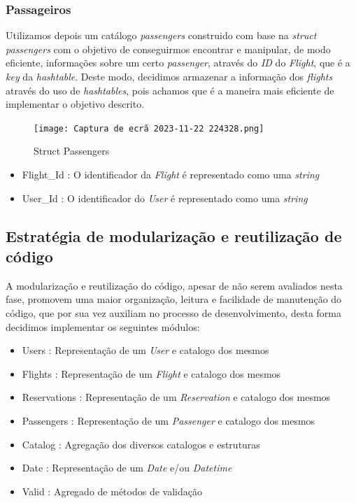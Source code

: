 \documentclass[11pt]{article}
\begin{document}
\subsubsection{Passageiros}
    Utilizamos depois um catálogo \textit{passengers} construido
    com base na \textit{struct passengers} com o objetivo de conseguirmos encontrar e manipular, de modo eficiente, informações sobre um certo \textit{passenger}, através do \textit{ID} do \textit{Flight}, que é a \textit{key} da \textit{hashtable}. Deste modo, decidimos armazenar a informação dos \textit{flights} através do uso de \textit{hashtables}, pois achamos que é a maneira mais eficiente de implementar o objetivo descrito.
    
    \begin{figure}[hbt!]
        \centering
        \texttt{[image: Captura de ecrã 2023-11-22 224328.png]}
        \caption{Struct Passengers}
        \label{fig:example}
    \end{figure}
    
    \begin{itemize}
        \item Flight_Id : O identificador da \textit{Flight} é representado como uma \textit{string}
        \item User_Id : O identificador do \textit{User} é representado como uma \textit{string}
    \end{itemize}
\newpage


\subsection{Estratégia de modularização e reutilização de código}
A modularização e reutilização do código, apesar de não serem avaliados nesta fase, promovem uma maior organização, leitura e facilidade de manutenção do código, que por sua vez auxiliam no processo de desenvolvimento, desta forma decidimos implementar os seguintes módulos:
    \begin{itemize}
        \item Users : Representação de um \textit{User} e catalogo dos mesmos
        \item Flights : Representação de um \textit{Flight} e catalogo dos mesmos
        \item Reservations : Representação de um \textit{Reservation} e catalogo dos mesmos
        \item Passengers : Representação de um \textit{Passenger} e catalogo dos mesmos
        \item Catalog : Agregação dos diversos catalogos e estruturas
        \item Date : Representação de um \textit{Date} e/ou \textit{Datetime}
        \item Valid : Agregado de métodos de validação 
    \end{itemize}
\end{document}
